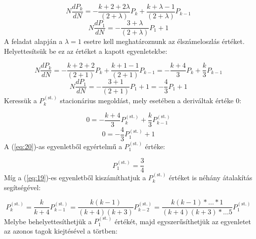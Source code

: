 \begin{equation} \label{eq:15}
    N \frac{d P_{k}}{dN}
    =
    -\frac{k + 2 + 2 \lambda}{\left( 2 + \lambda \right)} P_{k} + \frac{k + \lambda - 1}{\left( 2 + \lambda \right)} P_{k-1}
\end{equation}
\begin{equation} \label{eq:16}
    N \frac{d P_{1}}{dN}
    =
    -\frac{3 + \lambda}{\left( 2 + \lambda \right)} P_{1} + 1
\end{equation}
A feladat alapján a $\lambda = 1$ esetre kell meghatároznunk az élszámeloszlás értéket. Helyettesítsük be ez az értéket a kapott egyenletekbe:

\begin{equation} \label{eq:17}
    N \frac{d P_{k}}{dN}
    =
    -\frac{k + 2 + 2}{\left( 2 + 1 \right)} P_{k} + \frac{k + 1 - 1}{\left( 2 + 1 \right)} P_{k-1}
    =
    -\frac{k + 4}{3} P_{k} + \frac{k}{3} P_{k-1}
\end{equation}
\begin{equation} \label{eq:18}
    N \frac{d P_{1}}{dN}
    =
    -\frac{3 + 1}{\left( 2 + 1 \right)} P_{1} + 1
    =
    -\frac{4}{3} P_{1} + 1
\end{equation}
Keressük a $P_{k}^{\left( \text{st.} \right)}$ stacionárius megoldást, mely esetében a deriváltak értéke $0$:

\begin{equation} \label{eq:19}
    0
    =
    -\frac{k + 4}{3} P_{k}^{\left( \text{st.} \right)} + \frac{k}{3} P_{k-1}^{\left( \text{st.} \right)}
\end{equation}
\begin{equation} \label{eq:20}
    0
    =
    -\frac{4}{3} P_{1}^{\left( \text{st.} \right)} + 1
\end{equation}
A (\ref{eq:20})-as egyenletből egyértelmű a $P_{1}^{\left( \text{st.} \right)}$ értéke:

\begin{equation} \label{eq:21}
    P_{1}^{\left( \text{st.} \right)}
    =
    \frac{3}{4}
\end{equation}
Míg a (\ref{eq:19})-es egyenletből kiszámíthatjuk a $P_{k}^{\left( \text{st.} \right)}$ értéket is néhány átalakítás segítségével:

\begin{equation} \label{eq:22}
    P_{k}^{\left( \text{st.} \right)}
    =
    \frac{k}{k + 4} P_{k - 1}^{\left( \text{st.} \right)}
    =
    \frac{k \left( k - 1 \right)}{\left( k + 4 \right) \left( k + 3 \right)} P_{k - 2}^{\left( \text{st.} \right)}
    =
    \frac{k \left( k - 1 \right) * \dotsc * 1}{\left( k + 4 \right) \left( k + 3 \right) * \dotsc 5} P_{1}^{\left( \text{st.} \right)}
\end{equation}
Melybe behelyettesíthetjük a $P_{1}^{\left( \text{st.} \right)}$ értékét, majd egyszerűsíthetjük az egyenletet az azonos tagok kiejtésével a törtben:

